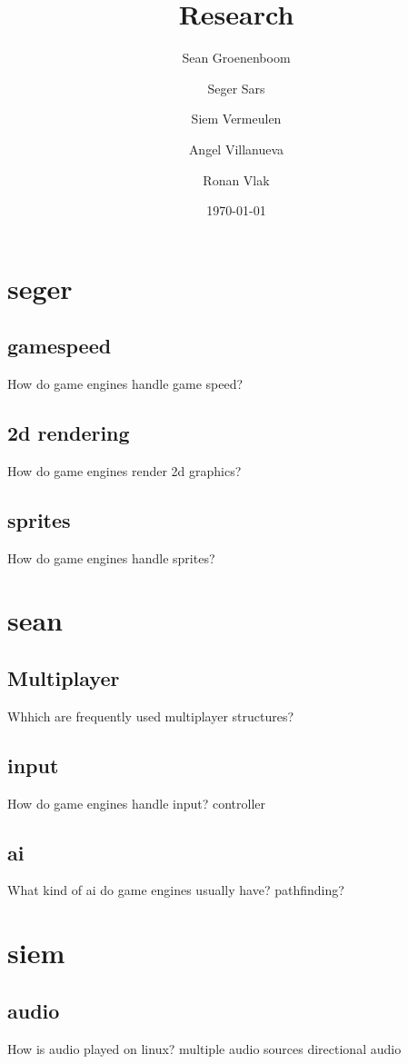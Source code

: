 \documentclass{article} %
\title{Research} %
\author{Sean Groenenboom \and Seger Sars \and Siem Vermeulen \and Angel Villanueva \and Ronan Vlak} %
\date{\today} %
\begin{document}
\maketitle %
\newpage

\tableofcontents %
\newpage

\section{seger}
    \subsection{gamespeed}
    How do game engines handle game speed?
    \subsection{2d rendering}
    How do game engines render 2d graphics?
    \subsection{sprites}
    How do game engines handle sprites?
\newpage

\section{sean}
    \subsection{Multiplayer}
    Whhich are frequently used multiplayer structures?
    \subsection{input}
    How do game engines handle input?
    controller
    \subsection{ai}
    What kind of ai do game engines usually have?
    pathfinding?
\newpage

\section{siem}
    \subsection{audio}
    How is audio played on linux?
    multiple audio sources
    directional audio
\end{document}
